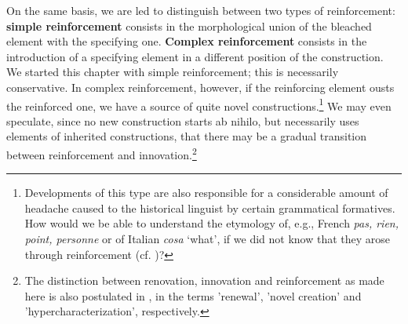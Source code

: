 On the same basis, we are led to distinguish between two types of reinforcement: \textbf{simple reinforcement} consists in the morphological union of the bleached element with the specifying one. \textbf{Complex reinforcement} consists in the introduction of a specifying element in a different position of the construction. We started this chapter with simple reinforcement; this is necessarily conservative. In complex reinforcement, however, if the reinforcing element ousts the reinforced one, we have a source of quite novel constructions.\footnote{Developments of this type are also responsible for a considerable amount of headache caused to the historical linguist by certain grammatical formatives. How would we be able to understand the etymology of, e.g., French \textit{pas, rien, point, personne} or of Italian \textit{cosa} ‘what’, if we did not know that they arose through reinforcement (cf. )?} We may even speculate, since no new construction starts ab nihilo, but necessarily uses elements of inherited constructions, that there may be a gradual transition between reinforcement and innovation.\footnote{The distinction between renovation, innovation and reinforcement as made here is also postulated in \citet[115]{Kahr1976}, in the terms 'renewal', 'novel creation' and 'hypercharacterization', respectively.}
